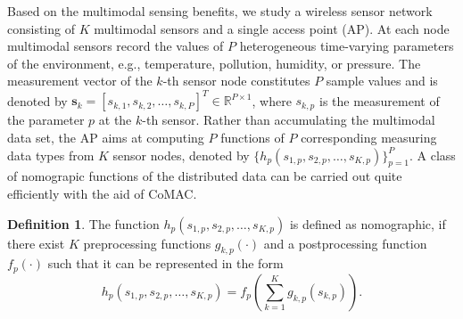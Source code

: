 \documentclass[journal]{IEEEtran}
\theoremstyle{definition}
\newtheorem{definition}{Definition}[section]
\begin{document}
	Based on the multimodal sensing benefits, we study a wireless sensor network consisting of $K$ multimodal sensors and a single access point (AP).	At each node multimodal sensors record the values of $P$ heterogeneous time-varying parameters of the environment, e.g., temperature, pollution, humidity, or pressure. The measurement vector of the $k$-th sensor node constitutes $P$ sample values and is denoted by $\mathbf{s}_k = [s_{k,1}, s_{k,2}, \dots, s_{k, P}]^T \in \mathbb{R}^{P \times 1}$, where $s_{k,p}$ is the measurement of the parameter $p$ at the $k$-th sensor. Rather than accumulating the multimodal data set, the AP aims at computing $P$ functions of $P$ corresponding measuring data types from $K$ sensor nodes, denoted by $\{h_p (s_{1,p}, s_{2,p}, \dots, s_{K, p}) \}_{p=1}^P$. A class of nomograpic functions of the distributed data can be carried out quite efficiently with the aid of CoMAC. 
	\begin{definition}
	The function $h_p (s_{1,p}, s_{2,p}, \dots, s_{K, p}) $ is defined as nomographic, if there exist $K$ preprocessing functions $g_{k,p}(\cdot)$ and a postprocessing function $f_p(\cdot)$ such that it can be represented in the form \vspace{-0.2cm}
	\begin{equation}
	    h_p (s_{1,p}, s_{2,p}, \dots, s_{K, p}) = f_p\left (\sum_{k=1}^K g_{k,p}(s_{k,p})\right ).
	    \label{nomographicF}
	\end{equation}
		\end{definition}
		\begin{center}
		\vspace{-0.2cm}

\end{center}
\end{document}
